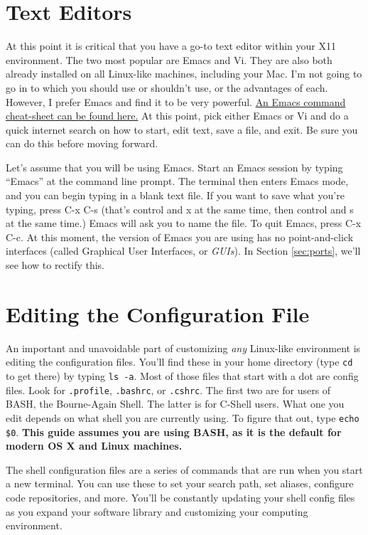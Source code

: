 \documentclass[12pt, letterpaper]{article}
\begin{document}
\section{Text Editors}
At this point it is critical that you have a go-to text editor within your
X11 environment.  The two most popular are Emacs and Vi.  They are also both
already installed on all Linux-like machines, including your Mac.
I'm not going to go in to which you should use or shouldn't use, or the
advantages of each.  However, I prefer Emacs and find it to be very powerful.
\href{https://www.gnu.org/software/emacs/refcards/pdf/refcard.pdf}{An
  Emacs command cheat-sheet can be found here.}  At this point, pick either
Emacs or Vi and do a quick internet search on how to start, edit text, save
a file, and exit.  Be sure you can do this before moving forward.

Let's assume that you will be using Emacs.  Start an Emacs session by
typing ``Emacs'' at the command line prompt.  The terminal then enters Emacs
mode, and you can begin typing in a blank text file.  If you want to save
what you're typing, press C-x C-s (that's control and x at the same time,
then control and s at the same time.)  Emacs will ask you to name the file.
To quit Emacs, press C-x C-c.  At this moment, the version of Emacs you are
using has no point-and-click interfaces (called Graphical User Interfaces, or
\emph{GUIs}).  In Section \ref{sec:ports}, we'll see how to rectify this.

\section{Editing the Configuration File}
An important and unavoidable part of customizing \emph{any} Linux-like
environment is editing the configuration files.  You'll find these in your
home directory (type {\tt cd} to get there) by typing {\tt ls -a}.  Most of
those files that start with a dot are config files.  Look for {\tt .profile},
{\tt .bashrc}, or {\tt .cshrc}.  The first two are for users of BASH, the
Bourne-Again Shell.  The latter is for C-Shell users.  What one you edit
depends on what shell you are currently using.  To figure that out, type
{\tt echo \$0}.  \textbf{This guide assumes you are using BASH, as it is the
  default for modern OS X and Linux machines.}

The shell configuration files are a series of commands that are run when you
start a new terminal.  You can use these to set your search path, set aliases,
configure code repositories, and more.  You'll be constantly updating your
shell config files as you expand your software library and customizing your
computing environment.
\end{document}
